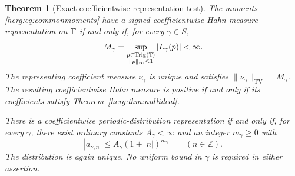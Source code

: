 \documentclass[11pt,letterpaper]{article}
\newtheorem{theorem}{Theorem}[section]
\theoremstyle{definition}
\newcommand{\Z}{\mathbb Z}\newcommand{\N}{\mathbb N}
\newcommand{\TV}{\mathrm{TV}}
\newcommand{\trig}{\operatorname{Trig}}
\numberwithin{equation}{section}
\begin{document}
\begin{theorem}[Exact coefficientwise representation test]\label{herg:thm:representation}
The moments \eqref{herg:eq:commonmoments} have a signed coefficientwise Hahn-measure representation on $\mathbb T$ if and only if, for every $\gamma\in S$,
\begin{equation}\label{herg:eq:variationtest}
 M_\gamma=
 \sup_{\substack{p\in\trig(\T)\\\|p\|_\infty\le1}}
 |L_\gamma(p)|<\infty.
\end{equation}
The representing coefficient measure $\nu_\gamma$ is unique and satisfies $\|\nu_\gamma\|_{\TV}=M_\gamma$. The resulting coefficientwise Hahn measure is positive if and only if its coefficients satisfy Theorem~\ref{herg:thm:nullideal}.

There is a coefficientwise periodic-distribution representation if and only if, for every $\gamma$, there exist ordinary constants $A_\gamma<\infty$ and an integer $m_\gamma\ge0$ with
\begin{equation}\label{herg:eq:distributiontest}
 |a_{\gamma,n}|\le A_\gamma(1+|n|)^{m_\gamma}
 \qquad(n\in\Z).
\end{equation}
The distribution is again unique. No uniform bound in $\gamma$ is required in either assertion.
\end{theorem}
\end{document}
